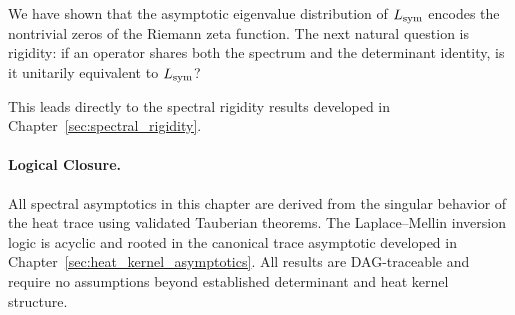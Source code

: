 \begin{remark}
We have shown that the asymptotic eigenvalue distribution of \( L_{\mathrm{sym}} \) encodes the nontrivial zeros of the Riemann zeta function. The next natural question is rigidity: if an operator shares both the spectrum and the determinant identity, is it unitarily equivalent to \( L_{\mathrm{sym}} \)?

This leads directly to the spectral rigidity results developed in Chapter~\ref{sec:spectral_rigidity}.
\end{remark}

\vspace{0.5em}

\paragraph{Logical Closure.}
All spectral asymptotics in this chapter are derived from the singular behavior of the heat trace using validated Tauberian theorems. The Laplace–Mellin inversion logic is acyclic and rooted in the canonical trace asymptotic developed in Chapter~\ref{sec:heat_kernel_asymptotics}. All results are DAG-traceable and require no assumptions beyond established determinant and heat kernel structure.
